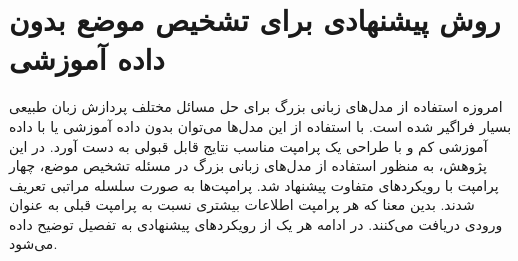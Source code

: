 \chapter{روش پیشنهادی برای تشخیص موضع بدون داده آموزشی}

\setlength\parindent{0pt}   %
\setlength\columnsep{0.25in} %
\pagestyle{empty}           %




\thispagestyle{empty}


امروزه استفاده از مدل‌های زبانی بزرگ برای حل مسائل مختلف پردازش زبان طبیعی بسیار فراگیر شده است. با استفاده از این مدل‌ها می‌توان بدون داده آموزشی یا با داده آموزشی کم و با طراحی یک پرامپت مناسب
 نتایج قابل قبولی به دست آورد. در این پژوهش، به منظور استفاده از مدل‌های زبانی بزرگ در مسئله تشخیص موضع، چهار پرامپت با رویکردهای متفاوت پیشنهاد شد. پرامپت‌ها به صورت سلسله مراتبی تعریف شدند. بدین معنا که هر پرامپت اطلاعات بیشتری نسبت به پرامپت قبلی به عنوان ورودی دریافت می‌کنند. در ادامه هر یک از رویکردهای پیشنهادی به تفصیل توضیح داده می‌شود.


